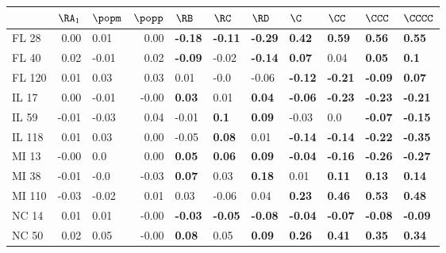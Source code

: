 \begin{tabular}{lrlrlllllll}
\toprule
{} &  $\RA_1$ &        $\popm$ &  $\popp$ &           $\RB$ &           $\RC$ &           $\RD$ &            $\C$ &           $\CC$ &          $\CCC$ &         $\CCCC$ \\
\midrule
FL 28   &     0.00 &           0.01 &     0.00 &  \textbf{-0.18} &  \textbf{-0.11} &  \textbf{-0.29} &   \textbf{0.42} &   \textbf{0.59} &   \textbf{0.56} &   \textbf{0.55} \\
FL 40   &     0.02 &          -0.01 &     0.02 &  \textbf{-0.09} &           -0.02 &  \textbf{-0.14} &   \textbf{0.07} &            0.04 &   \textbf{0.05} &    \textbf{0.1} \\
FL 120  &     0.01 &           0.03 &     0.03 &            0.01 &            -0.0 &           -0.06 &  \textbf{-0.12} &  \textbf{-0.21} &  \textbf{-0.09} &   \textbf{0.07} \\
IL 17   &     0.00 &          -0.01 &    -0.00 &   \textbf{0.03} &            0.01 &   \textbf{0.04} &  \textbf{-0.06} &  \textbf{-0.23} &  \textbf{-0.23} &  \textbf{-0.21} \\
IL 59   &    -0.01 &          -0.03 &     0.04 &           -0.01 &    \textbf{0.1} &   \textbf{0.09} &           -0.03 &             0.0 &  \textbf{-0.07} &  \textbf{-0.15} \\
IL 118  &     0.01 &           0.03 &     0.00 &           -0.05 &   \textbf{0.08} &            0.01 &  \textbf{-0.14} &  \textbf{-0.14} &  \textbf{-0.22} &  \textbf{-0.35} \\
MI 13   &    -0.00 &            0.0 &     0.00 &   \textbf{0.05} &   \textbf{0.06} &   \textbf{0.09} &  \textbf{-0.04} &  \textbf{-0.16} &  \textbf{-0.26} &  \textbf{-0.27} \\
MI 38   &    -0.01 &           -0.0 &    -0.03 &   \textbf{0.07} &            0.03 &   \textbf{0.18} &            0.01 &   \textbf{0.11} &   \textbf{0.13} &   \textbf{0.14} \\
MI 110  &    -0.03 &          -0.02 &     0.01 &            0.03 &           -0.06 &            0.04 &   \textbf{0.23} &   \textbf{0.46} &   \textbf{0.53} &   \textbf{0.48} \\
NC 14   &     0.01 &           0.01 &    -0.00 &  \textbf{-0.03} &  \textbf{-0.05} &  \textbf{-0.08} &  \textbf{-0.04} &  \textbf{-0.07} &  \textbf{-0.08} &  \textbf{-0.09} \\
NC 50   &     0.02 &           0.05 &    -0.00 &   \textbf{0.08} &            0.05 &   \textbf{0.09} &   \textbf{0.26} &   \textbf{0.41} &   \textbf{0.35} &   \textbf{0.34} \\

\end{tabular}
